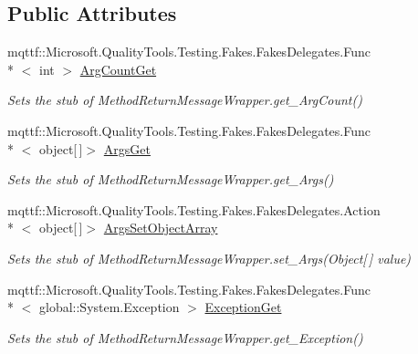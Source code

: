 \subsection*{Public Attributes}
\begin{DoxyCompactItemize}
\item 
mqttf\-::\-Microsoft.\-Quality\-Tools.\-Testing.\-Fakes.\-Fakes\-Delegates.\-Func\\*
$<$ int $>$ \hyperlink{class_system_1_1_runtime_1_1_remoting_1_1_messaging_1_1_fakes_1_1_stub_method_return_message_wrapper_ab2f883b49c946fb1dbc2eb7807f158ae}{Arg\-Count\-Get}
\begin{DoxyCompactList}\small\item\em Sets the stub of Method\-Return\-Message\-Wrapper.\-get\-\_\-\-Arg\-Count()\end{DoxyCompactList}\item 
mqttf\-::\-Microsoft.\-Quality\-Tools.\-Testing.\-Fakes.\-Fakes\-Delegates.\-Func\\*
$<$ object\mbox{[}$\,$\mbox{]}$>$ \hyperlink{class_system_1_1_runtime_1_1_remoting_1_1_messaging_1_1_fakes_1_1_stub_method_return_message_wrapper_a5e0d649cfffe99ff8448b967186b6925}{Args\-Get}
\begin{DoxyCompactList}\small\item\em Sets the stub of Method\-Return\-Message\-Wrapper.\-get\-\_\-\-Args()\end{DoxyCompactList}\item 
mqttf\-::\-Microsoft.\-Quality\-Tools.\-Testing.\-Fakes.\-Fakes\-Delegates.\-Action\\*
$<$ object\mbox{[}$\,$\mbox{]}$>$ \hyperlink{class_system_1_1_runtime_1_1_remoting_1_1_messaging_1_1_fakes_1_1_stub_method_return_message_wrapper_a649ef5e4b3e2dfb783c72511d41dbc2f}{Args\-Set\-Object\-Array}
\begin{DoxyCompactList}\small\item\em Sets the stub of Method\-Return\-Message\-Wrapper.\-set\-\_\-\-Args(\-Object\mbox{[}$\,$\mbox{]} value)\end{DoxyCompactList}\item 
mqttf\-::\-Microsoft.\-Quality\-Tools.\-Testing.\-Fakes.\-Fakes\-Delegates.\-Func\\*
$<$ global\-::\-System.\-Exception $>$ \hyperlink{class_system_1_1_runtime_1_1_remoting_1_1_messaging_1_1_fakes_1_1_stub_method_return_message_wrapper_ad71e8c085c71b11010ae91c4bafd10cd}{Exception\-Get}
\begin{DoxyCompactList}\small\item\em Sets the stub of Method\-Return\-Message\-Wrapper.\-get\-\_\-\-Exception()\end{DoxyCompactList}\item 

\end{DoxyCompactItemize}

